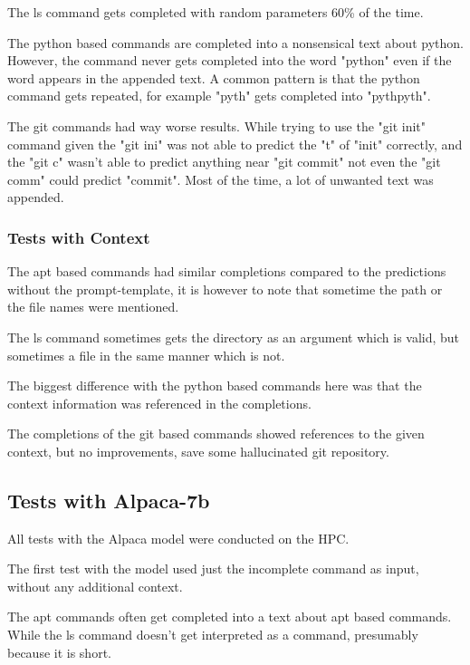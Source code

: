 The ls command gets completed with random parameters 60\% of the time.


The python based commands are completed into a nonsensical text about python. However, the command never gets completed into the word "python" even if the word appears in the appended text. A common pattern is that the python command gets repeated, for example "pyth" gets completed into "pythpyth". 


The git commands had way worse results. While trying to use the "git init" command given the "git ini" was not able to predict the "t" of "init" correctly, and the "git c" wasn't able to predict anything near "git commit" not even  the "git comm" could predict "commit". Most of the time, a lot of unwanted text was appended. 



\subsubsection{Tests with Context}

The apt based commands had similar completions compared to the predictions without the prompt-template, it is however to note that sometime the path or the file names were mentioned.


The ls command sometimes gets the directory as an argument which is valid, but sometimes a file in the same manner which is not.


The biggest difference with the python based commands here was that the context information was referenced in the completions.


The completions of the git based commands showed references to the given context, but no improvements, save some hallucinated git repository.









\subsection{Tests with Alpaca-7b}



All tests with the Alpaca model were conducted on the HPC.


The first test with the model used just the incomplete command as input, without any additional context.



The apt commands often get completed into a text about apt based commands. While the ls command doesn't get interpreted as a command, presumably because it is short.




